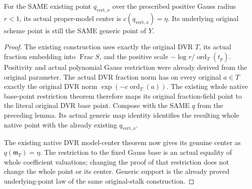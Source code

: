 \begin{theorem}
\label{thm:gauss-common-existing-native-vertical-center}
\leanok
For the SAME existing point $q_{\mathrm{vert},x}$ over the prescribed
positive Gauss radius $r<1$, its actual proper-model center is
$c(q_{\mathrm{vert},x})=\eta$. Its underlying original scheme point is
still the SAME generic point of $Y$.
\end{theorem}
\begin{proof}
The existing construction uses exactly the original DVR $T$, its actual
fraction embedding into $\operatorname{Frac}S$, and the positive scale
$-\log r/\operatorname{ord}_T(t_p)$. Positivity and actual polynomial
Gauss restriction were already derived from the original parameter.
The actual DVR fraction norm has on every original $a\in T$ exactly
the original DVR norm $\exp(-c\operatorname{ord}_T(a))$.
The existing whole native base-point restriction theorem therefore maps
its original fraction-field point to the literal original DVR base point.
Compose with the SAME $q$ from the preceding lemma. Its actual generic
map identity identifies the resulting whole native point with the
already existing $q_{\mathrm{vert},x}$.

The existing native DVR model-center theorem now gives its genuine
center as $q(\mathfrak m_T)=\eta$. The restriction to the fixed Gauss
base is an actual equality of whole coefficient valuations; changing
the proof of that restriction does not change the whole point or its
center. Generic support is the already proved underlying-point law of
the same original-stalk construction.
\end{proof}

